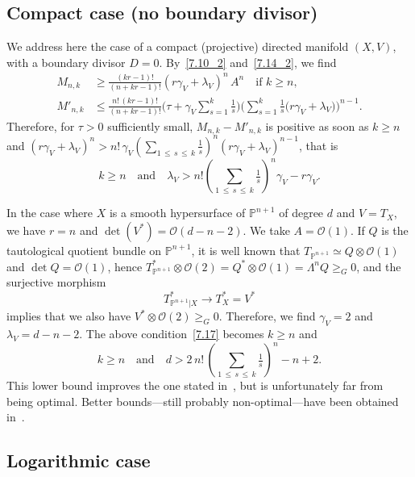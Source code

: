 \documentclass[AHL,Unicode,longabstracts,published]{cedram}
\newcommand*\cO{\mathcal{O}}
\newcommand*\bP{\mathbb{P}}
\let\leq\leqslant
\let\geq\geqslant
\begin{document}
\subsection{Compact case (no boundary divisor)}

We address here the case of a compact (projective) directed manifold $(X,V)$, with a boundary divisor $D=0$. By~\eqref{7.10_2} and~\eqref{7.14_2}, we find
\begin{align*}
M_{n,k}&\geq \tfrac{(kr-1)!}{(n+kr-1)!}(r\gamma_V+\lambda_V)^n\,A^n\quad
\text{if $k\geq n$},\\
M'_{n,k}&\leq \tfrac{n!\,(kr-1)!}{(n+kr-1)!}
\Bigg(\tau+\gamma_V\sum_{s=1}^k\tfrac{1}{ s}\Bigg)\Bigg(\sum_{s=1}^k
\tfrac{1}{ s}\big(r\gamma_V+\lambda_V\big)\Bigg)^{n-1}.
\end{align*}
Therefore, for $\tau>0$ sufficiently small, $M_{n,k}-M'_{n,k}$ is positive as soon as $k\geq n$ and $(r\gamma_V+\lambda_V)^n>n!\,\gamma_V(
\sum_{1\,\leq\,s\,\leq\,k}\tfrac{1}{ s})^n(r\gamma_V+\lambda_V)^{n-1}$, that is
\begin{equation}\label{7.17}
k\geq n\quad 
\text{and}\quad
\lambda_V > n!
\left(\sum_{1\,\leq\,s\,\leq\,k}\tfrac{1}{ s}\right)^n\gamma_V - r\gamma_V.
\end{equation}

\begin{exam}
In the case where $X$ is a smooth hypersurface of $\bP^{n+1}$ of degree $d$ and $V=T_X$, we have $r=n$ and $\det(V^*)=\cO(d-n-2)$. We take $A=\cO(1)$. If $Q$ is the tautological quotient bundle on
$\bP^{n+1}$, it is well known that $T_{\bP^{n+1}}\simeq Q\otimes\cO(1)$ and
$\det Q=\cO(1)$, hence
$T^*_{\bP^{n+1}}\otimes\cO(2)=Q^*\otimes \cO(1)=\Lambda^nQ\geq_G0$, and the surjective morphism
\[
T^*_{\bP^{n+1}|X}\to T^*_X=V^*
\]
implies that we also have $V^*\otimes\cO(2)\geq_G 0$. Therefore, we find $\gamma_V=2$ and $\lambda_V=d-n-2$. The above condition~\eqref{7.17} becomes $k\geq n$ and
\[
k\geq n\quad\text{and}\quad d>2\,n!\,\left(\sum_{1\,\leq\,s\,\leq\,k}\tfrac{1}{s}\right)^n-n+2.
\]
This lower bound improves the one stated in~\cite{Dem12}, but is unfortunately far from being optimal. Better bounds---still probably non-optimal---have been obtained in~\cite{Dar16,MTa19}.
\end{exam}

\subsection{Logarithmic case}
\end{document}
